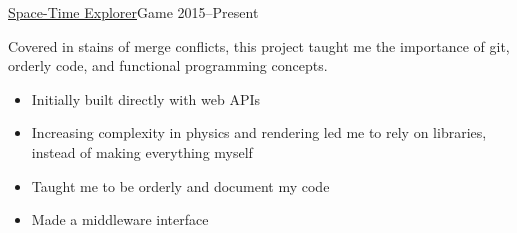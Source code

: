 \documentclass[10pt,a4paper,ragged2e,withhyper]{altacv}
\begin{document}
\begin{paracol}{2}
		\cvevent
		{\href{https://github.com/jaacko-torus/STE}{\uline{Space-Time Explorer}}{\hr}Game}
		{{\CVTagTypeScript}{\CVTagSnowpack}{\CVTagPFiveJS}{\CVTagMatterJS}{\CVTagdatGUI}}
		{2015--Present}{}
		\vspace{-0.3cm}
		\begin{justify}
			Covered in stains of merge conflicts, this project taught me the importance of git, orderly code, and functional programming concepts.
		\end{justify}
		\vspace{-0.2cm}
		\smallskip
		\begin{itemize}
			\item Initially built directly with web APIs
			\item Increasing complexity in physics and rendering led me to rely on libraries, instead of making everything myself
			\item Taught me to be orderly and document my code
			\item Made a middleware interface
		\end{itemize}
		
	\end{paracol}
\end{document}

